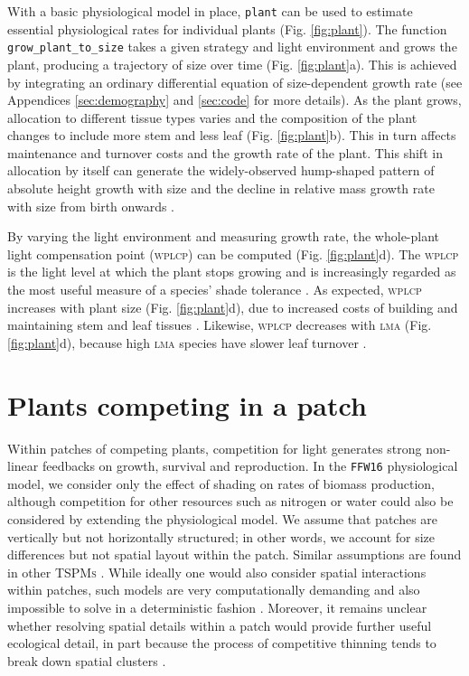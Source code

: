 \documentclass[a4paper,11pt]{article}
\newcommand{\plant}{\texttt{plant}}
\begin{document}
With a basic physiological model in place, {\plant} can be used to estimate
essential physiological rates for individual plants
(Fig. \ref{fig:plant}). The function \texttt{grow\_plant\_to\_size}
takes a given strategy and light environment and grows the plant,
producing a trajectory of size over time (Fig. \ref{fig:plant}a). This
is achieved by integrating an ordinary differential equation of
size-dependent growth rate (see Appendices \ref{sec:demography} and
\ref{sec:code} for more details). As the plant grows, allocation to
different tissue types varies and the composition of the plant
changes to include more stem and less leaf
(Fig. \ref{fig:plant}b). This in turn affects maintenance and turnover
costs and the growth rate of the plant.  This
shift in allocation by itself can generate the widely-observed hump-shaped pattern
of absolute height growth with size \citep[Fig. \ref{fig:plant}c;][]{King-2011} and the decline in relative mass growth rate with size from birth onwards \citep{Enquist-2007}.

By varying the light environment and measuring growth rate, the whole-plant light compensation point (\textsc{wplcp}) can be computed (Fig.
\ref{fig:plant}d). The \textsc{wplcp} is the light level at which the plant
stops growing and is increasingly regarded as the most useful
measure of a species' shade tolerance
\citep{Givnish-1988, Baltzer-2007, Lusk-2013}. As expected, \textsc{wplcp}
increases with plant size (Fig. \ref{fig:plant}d), due to increased costs of building and
maintaining stem and leaf tissues \citep{Givnish-1988}. Likewise, \textsc{wplcp}
decreases with \textsc{lma} (Fig. \ref{fig:plant}d), because high \textsc{lma} species have slower leaf turnover \citep{Baltzer-2007, Lusk-2013}.

\section{Plants competing in a patch}

Within patches of competing plants, competition for light generates
strong non-linear feedbacks on growth, survival and reproduction. In the
\texttt{FFW16} physiological model, we consider only the effect of
shading on rates of biomass production, although competition for other
resources such as nitrogen or water could also be considered by extending the
physiological model. We assume that patches are vertically but not horizontally
structured; in other words, we account for size differences but not spatial
layout within the patch. Similar assumptions are found in other \textsc{TSPMs}
\citep{Shugart-1980, Kohyama-1993, Huston-1987, Moorcroft-2001, Smith-2014}.
While ideally one would also consider spatial interactions within patches,
such models are very computationally demanding and also
impossible to solve in a deterministic fashion \citep{Shugart-1980,
Pacala-1996}. Moreover, it remains unclear whether resolving spatial details within a
patch would provide further useful ecological detail, in part because the
process of competitive thinning tends to break down spatial clusters
\citep{Strigul-2008}.
\end{document}
